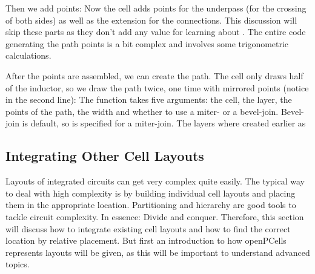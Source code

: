 Then we add points:
Now the cell adds points for the underpass (for the crossing of both sides) as well as the extension for the connections.
This discussion will skip these parts as they don't add any value for learning about .
The entire code generating the path points is a bit complex and involves some trigonometric calculations.

After the points are assembled, we can create the path. The cell only draws half of the inductor, so we draw the path twice, one time with mirrored points (notice
 in the second line):
The  function takes five arguments: the cell, the layer, the points of the path, the width and whether to use a miter- or a bevel-join. Bevel-join is
default, so  is specified for a miter-join.
The layers where created earlier as

\subsection{Integrating Other Cell Layouts}
Layouts of integrated circuits can get very complex quite easily.
The typical way to deal with high complexity is by building individual cell layouts and placing them in the appropriate location.
Partitioning and hierarchy are good tools to tackle circuit complexity.
In essence: Divide and conquer.
Therefore, this section will discuss how to integrate existing cell layouts and how to find the correct location by relative placement.
But first an introduction to how openPCells represents layouts will be given, as this will be important to understand advanced topics.

